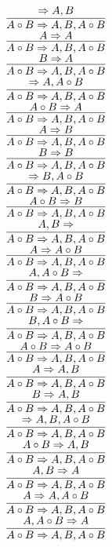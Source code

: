 \documentclass[11pt]{article}
\begin{document}
\begin{center}
\bigskip
\\$\infer{A\circ B\Rightarrow A, B, A\circ B}{\Rightarrow A, B}$
\bigskip
\\$\infer{A\circ B\Rightarrow A, B, A\circ B}{A\Rightarrow A}$
\bigskip
\\$\infer{A\circ B\Rightarrow A, B, A\circ B}{B\Rightarrow A}$
\bigskip
\\$\infer{A\circ B\Rightarrow A, B, A\circ B}{\Rightarrow A, A\circ B}$
\bigskip
\\$\infer{A\circ B\Rightarrow A, B, A\circ B}{A\circ B\Rightarrow A}$
\bigskip
\\$\infer{A\circ B\Rightarrow A, B, A\circ B}{A\Rightarrow B}$
\bigskip
\\$\infer{A\circ B\Rightarrow A, B, A\circ B}{B\Rightarrow B}$
\bigskip
\\$\infer{A\circ B\Rightarrow A, B, A\circ B}{\Rightarrow B, A\circ B}$
\bigskip
\\$\infer{A\circ B\Rightarrow A, B, A\circ B}{A\circ B\Rightarrow B}$
\bigskip
\\$\infer{A\circ B\Rightarrow A, B, A\circ B}{A, B\Rightarrow }$
\bigskip
\\$\infer{A\circ B\Rightarrow A, B, A\circ B}{A\Rightarrow A\circ B}$
\bigskip
\\$\infer{A\circ B\Rightarrow A, B, A\circ B}{A, A\circ B\Rightarrow }$
\bigskip
\\$\infer{A\circ B\Rightarrow A, B, A\circ B}{B\Rightarrow A\circ B}$
\bigskip
\\$\infer{A\circ B\Rightarrow A, B, A\circ B}{B, A\circ B\Rightarrow }$
\bigskip
\\$\infer{A\circ B\Rightarrow A, B, A\circ B}{A\circ B\Rightarrow A\circ B}$
\bigskip
\\$\infer{A\circ B\Rightarrow A, B, A\circ B}{A\Rightarrow A, B}$
\bigskip
\\$\infer{A\circ B\Rightarrow A, B, A\circ B}{B\Rightarrow A, B}$
\bigskip
\\$\infer{A\circ B\Rightarrow A, B, A\circ B}{\Rightarrow A, B, A\circ B}$
\bigskip
\\$\infer{A\circ B\Rightarrow A, B, A\circ B}{A\circ B\Rightarrow A, B}$
\bigskip
\\$\infer{A\circ B\Rightarrow A, B, A\circ B}{A, B\Rightarrow A}$
\bigskip
\\$\infer{A\circ B\Rightarrow A, B, A\circ B}{A\Rightarrow A, A\circ B}$
\bigskip
\\$\infer{A\circ B\Rightarrow A, B, A\circ B}{A, A\circ B\Rightarrow A}$
\bigskip

\end{center}
\end{document}
